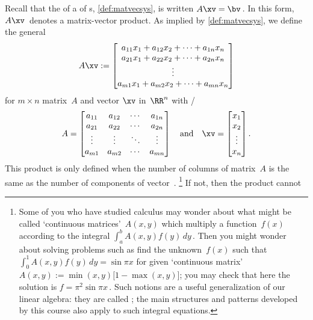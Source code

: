 Recall that the  of a  of s, \cref{def:matvecsys}, is written \(A\xv=\bv\)\,.  
In this form, \(A\xv\)~denotes a matrix-vector product.
As implied by \cref{def:matvecsys}, we define the general  
\begin{equation*}
A\xv:=
\begin{bmatrix} a_{11}x_1+a_{12}x_2+\cdots+a_{1n}x_n
\\a_{21}x_1+a_{22}x_2+\cdots+a_{2n}x_n
\\\vdots
\\a_{m1}x_1+a_{m2}x_2+\cdots+a_{mn}x_n
\end{bmatrix}
\end{equation*}
for \(m\times n\) matrix~\(A\) and vector \(\xv\) in~\(\RR^n\) with \slash {}
\begin{equation*}
A=\begin{bmatrix} a_{11}&a_{12}&\cdots&a_{1n}
\\a_{21}&a_{22}&\cdots&a_{2n}
\\\vdots&\vdots&\ddots&\vdots
\\a_{m1}&a_{m2}&\cdots&a_{mn} \end{bmatrix}
\quad\text{and}\quad
\xv=\begin{bmatrix} x_1\\x_2\\\vdots\\x_n \end{bmatrix}.
\end{equation*}
This product is only defined when the number of columns of matrix~\(A\) is the same as the number of components of vector~\xv.%
\footnote{Some of you who have studied calculus may wonder about what might be called `continuous matrices'~\(A(x,y)\) which multiply a function~\(f(x)\) according to the integral \(\int_a^b A(x,y)f(y)\,dy\)\,.  
Then you might wonder about solving problems such as find the unknown~\(f(x)\) such that \(\int_0^1 A(x,y)f(y)\,dy=\sin\pi x\) for given `continuous matrix' \(A(x,y):=\min(x,y)\big[1-\max(x,y)\big]\); 
you may check that here the solution is \(f=\pi^2\sin\pi x\)\,.
Such notions are a useful generalization of our linear algebra: they are called ; the main structures and patterns developed by this course also apply to such integral equations.}
If not, then the product cannot 


